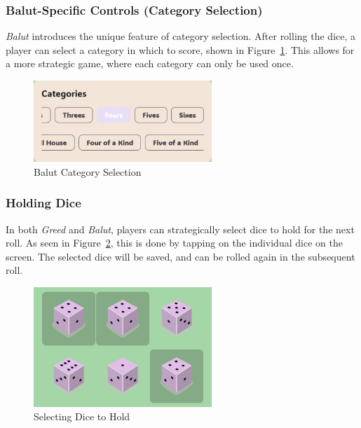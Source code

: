 \subsubsection{Balut-Specific Controls (Category Selection)}

\textit{Balut} introduces the unique feature of category selection. After rolling the dice, a player can select a category in which to score, shown in Figure~\ref{fig:control3}. This allows for a more strategic game, where each category can only be used once.

\begin{figure}[ht!]
    \centering
    \includegraphics[width=0.6\textwidth]{img/control3.jpg}
    \caption{Balut Category Selection}
    \label{fig:control3}
\end{figure}

\subsubsection{Holding Dice}

In both \textit{Greed} and \textit{Balut}, players can strategically select dice to hold for the next roll. As seen in Figure~\ref{fig:control4}, this is done by tapping on the individual dice on the screen. The selected dice will be saved, and can be rolled again in the subsequent roll.

\begin{figure}[ht!]
    \centering
    \includegraphics[width=0.6\textwidth]{img/control4.jpg}
    \caption{Selecting Dice to Hold}
     \label{fig:control4}
\end{figure}

